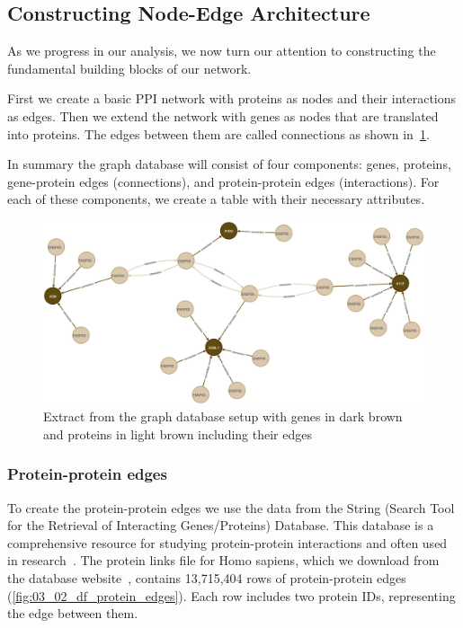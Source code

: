 \subsection{Constructing Node-Edge Architecture} \label{subsec:nodes_and_edges}

As we progress in our analysis, we now turn our attention to constructing the fundamental building blocks of our network.

First we create a basic PPI network with proteins as nodes and their interactions as edges.
Then we extend the network with genes as nodes that are translated into proteins.
The edges between them are called connections as shown in~\cref{fig:03_02_Network}.

In summary the graph database will consist of four components: genes, proteins,
gene-protein edges (connections), and protein-protein edges (interactions).
For each of these components, we create a table with their necessary attributes.


\begin{figure}[!h]
    \centering
    \includegraphics[width=1\textwidth]{figures/03_02_Network_2}
    \caption{Extract from the graph database setup with genes in dark brown and proteins in light brown including their edges}
    \label{fig:03_02_Network}
\end{figure}



\subsubsection*{Protein-protein edges} \label{subsubsec:protein_protein_edges}
To create the protein-protein edges we use the data from the String (Search Tool for the Retrieval of Interacting Genes/Proteins) Database.
This database is a comprehensive resource for studying protein-protein interactions and often used in research~\cite{Szklarczyk2020String}.
The protein links file for Homo sapiens, which we download from the database website~\cite{string_download},
contains 13,715,404 rows of protein-protein edges (\cref{fig:03_02_df_protein_edges}).
Each row includes two protein IDs, representing the edge between them.

